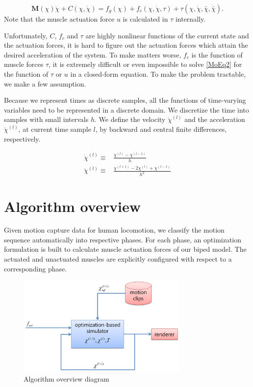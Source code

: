 \documentclass[master,english,final]{kaist-ucs}
\begin{document}
\begin{equation}\label{MoEq2}
\mathbf{M}(\chi)\ddot\chi + C(\chi,\dot\chi ) = f_g(\chi) + f_c(\chi, \dot\chi, \tau ) + \tau (\chi, \dot\chi, \bar\chi, \dot{\bar\chi}).
\end{equation}
Note that the muscle actuation force $u$ is calculated in $\tau$ internally.

Unfortunately, $C$, $f_c$ and $\tau$ are highly nonlinear functions of the current state and the
actuation forces, it is hard to figure out the actuation forces which attain
the desired acceleration of the system. To make matters worse, $f_c$ is the function
of muscle forces $\tau$, it is extremely difficult or even impossible
to solve \eqref{MoEq2} for the function of $\tau$ or $u$ in a closed-form
equation.
To make the problem tractable, we make a few assumption.

Because we represent times as discrete samples, all the functions of
time-varying variables need to be represented in a discrete domain.
We discretize the time into samples with small intervals $h$. We define
the velocity $\dot\chi^{(l)}$ and the acceleration $\ddot\chi^{(l)}$, at current
time sample $l$, by backward and central finite differences, respectively.

\begin{align}
\dot\chi^{(l)}  \equiv {} & \frac{\chi^{(l)}-\chi^{(l-1)}}{h}\label{vel-dis}\\
\ddot\chi^{(l)} \equiv {} & \frac{\chi^{(l+1)}-2\chi^{(l)}+\chi^{(l-1)}}{h^2}\label{acc-dis}
\end{align}


\chapter{Algorithm overview}

Given motion capture data for human locomotion, we classify the motion
sequence automatically into respective phases. For each phase,
an optimization formulation is built to calculate muscle actuation forces
of our biped model. The actuated and unactuated muscles are explicitly configured
with respect to a corresponding phase.

\begin{figure}[h!]
  \centering
  \includegraphics[width=0.75\textwidth]{overview}
  \caption{Algorithm overview diagram}
\end{figure}
\end{document}
